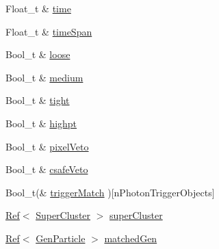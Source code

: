 \begin{DoxyCompactItemize}
Float\_\-t \& \hyperlink{classpanda_1_1Photon_a5d53d40926a8f262d6fd75dd430acb34}{time}
\item 
Float\_\-t \& \hyperlink{classpanda_1_1Photon_aa053c776f39fbca09098faa9e351d395}{timeSpan}
\item 
Bool\_\-t \& \hyperlink{classpanda_1_1Photon_a678f609622cbdfdedc600a8b55167990}{loose}
\item 
Bool\_\-t \& \hyperlink{classpanda_1_1Photon_adc0773a6ef6aa274fc554728e8affd63}{medium}
\item 
Bool\_\-t \& \hyperlink{classpanda_1_1Photon_a44a4110d57eddc5e32a839f12978c678}{tight}
\item 
Bool\_\-t \& \hyperlink{classpanda_1_1Photon_a026d84d5c7d76ca63e8831980a90a416}{highpt}
\item 
Bool\_\-t \& \hyperlink{classpanda_1_1Photon_acff0b261b32e6393e6172c1829ec95a4}{pixelVeto}
\item 
Bool\_\-t \& \hyperlink{classpanda_1_1Photon_ad1062c22cb21f142b0c17b671e2c775b}{csafeVeto}
\item 
Bool\_\-t(\& \hyperlink{classpanda_1_1Photon_a94008b3704aec12ec0639ec48741a624}{triggerMatch} )\mbox{[}nPhotonTriggerObjects\mbox{]}
\item 
\hyperlink{classpanda_1_1Ref}{Ref}$<$ \hyperlink{classpanda_1_1SuperCluster}{SuperCluster} $>$ \hyperlink{classpanda_1_1Photon_aec288384ab3d0be59dd5fc66785d5ea7}{superCluster}
\item 
\hyperlink{classpanda_1_1Ref}{Ref}$<$ \hyperlink{classpanda_1_1GenParticle}{GenParticle} $>$ \hyperlink{classpanda_1_1Photon_a9dafcd985f65b976edcb04c3b399f3b9}{matchedGen}
\end{DoxyCompactItemize}

